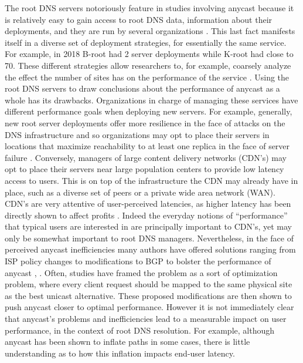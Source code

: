 \documentclass[sigconf,nonacm,10pt]{acmart}
\begin{document}
\label{sec:how_to_evaluate} The root DNS servers notoriously feature in
studies involving anycast because it is relatively easy to gain access
to root DNS data, information about their deployments, and they are run
by several organizations \cite{root_servers}. This last fact manifests
itself in a diverse set of deployment strategies, for essentially the
same service. For example, in 2018 B-root had 2 server deployments while
K-root had close to 70. These different strategies allow researchers to,
for example, coarsely analyze the effect the number of sites has on the
performance of the service \cite{li_levin_spring_bhattacharjee_2018}.
\break \break
Using the root DNS servers to draw conclusions about the performance of
anycast as a whole has its drawbacks. Organizations in charge of
managing these services have different performance goals when deploying
new servers. For example, generally, new root server deployments offer
more resilience in the face of attacks on the DNS infrastructure and so
organizations may opt to place their servers in locations that maximize
reachability to at least one replica in the face of server failure
\cite{moura2016anycast}. Conversely, managers of large content delivery
networks (CDN's) may opt to place their servers near large population
centers to provide low latency access to users. This is on top of the
infrastructure the CDN may already have in place, such as a diverse set
of peers or a private wide area network (WAN). CDN's are very attentive
of user-perceived latencies, as higher latency has been directly shown
to affect profits \cite{linden}. Indeed the everyday notions of
``performance'' that typical users are interested in are principally
important to CDN's, yet may only be somewhat important to root DNS
managers. \break
Nevertheless, in the face of perceived anycast inefficiencies many
authors have offered solutions ranging from ISP policy changes to
modifications to BGP to bolster the performance of anycast
\cite{li_levin_spring_bhattacharjee_2018},
\cite{huawei_evaluating_anycast}. Often, studies have framed the problem
as a sort of optimization problem, where every client request should be
mapped to the same physical site as the best unicast alternative. These
proposed modifications are then shown to push anycast closer to optimal
performance. \break \break
However it is not immediately clear that anycast's problems and
inefficiencies lead to a measurable impact on user performance, in the
context of root DNS resolution. For example, although anycast has been
shown to inflate paths in some cases, there is little understanding as
to how this inflation impacts end-user latency.
\end{document}
